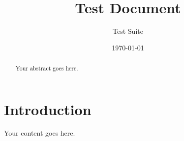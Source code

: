 \documentclass{article}
\title{Test Document}
\author{Test Suite}
\date{\today}
\begin{document}
\maketitle

\begin{abstract}
Your abstract goes here.
\end{abstract}

\section{Introduction}

Your content goes here.
\end{document}
